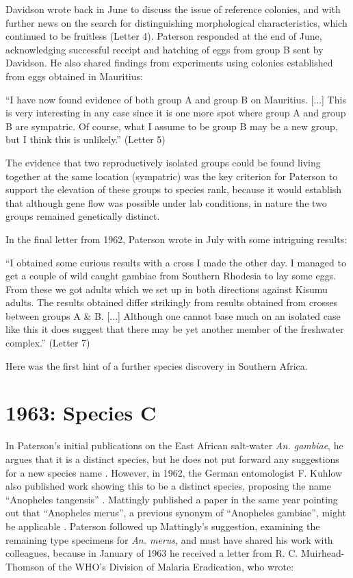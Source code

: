 \documentclass[a4paper,11pt,abstracton,hidelinks]{scrartcl}
\begin{document}
Davidson wrote back in June to discuss the issue of reference colonies, and with further news on the search for distinguishing morphological characteristics, which continued to be fruitless (Letter 4).
%
Paterson responded at the end of June, acknowledging successful receipt and hatching of eggs from group B sent by Davidson.
%
He also shared findings from experiments using colonies established from eggs obtained in Mauritius:
\begin{displayquote}
``I have now found evidence of both group A and group B on Mauritius. [...] 
%
This is very interesting in any case since it is one more spot where group A and group B are sympatric.
%
Of course, what I assume to be group B may be a new group, but I think this is unlikely.'' (Letter 5)
\end{displayquote}
The evidence that two reproductively isolated groups could be found living together at the same location (sympatric) was the key criterion for Paterson to support the elevation of these groups to species rank, because it would establish that although gene flow was possible under lab conditions, in nature the two groups remained genetically distinct.


In the final letter from 1962, Paterson wrote in July with some intriguing results:
\begin{displayquote}
``I obtained some curious results with a cross I made the other day. I managed to get a couple of wild caught gambiae from Southern Rhodesia to lay some eggs. From these we got adults which we set up in both directions against Kisumu adults. The results obtained differ strikingly from results obtained from crosses between groups A \& B. [...] Although one cannot base much on an isolated case like this it does suggest that there may be yet another member of the freshwater complex.'' (Letter 7)
\end{displayquote}
%
Here was the first hint of a further species discovery in Southern Africa.


\section{1963: Species C}


In Paterson's initial publications on the East African salt-water \textit{An. gambiae}, he argues that it is a distinct species, but he does not put forward any suggestions for a new species name \citep{Paterson1962a,Paterson1962b}. 
However, in 1962, the German entomologist F. Kuhlow also published work showing this to be a distinct species, proposing the name ``Anopheles tangensis'' \citep{Kuhlow1962}. 
Mattingly published a paper in the same year pointing out that ``Anopheles merus'', a previous synonym of ``Anopheles gambiae'', might be applicable \citep{Mattingly1962}. 
Paterson followed up Mattingly's suggestion, examining the remaining type specimens for \textit{An. merus}, and must have shared his work with colleagues, because in January of 1963 he received a letter from R. C. Muirhead-Thomson of the WHO's Division of Malaria Eradication, who wrote:
\end{document}
